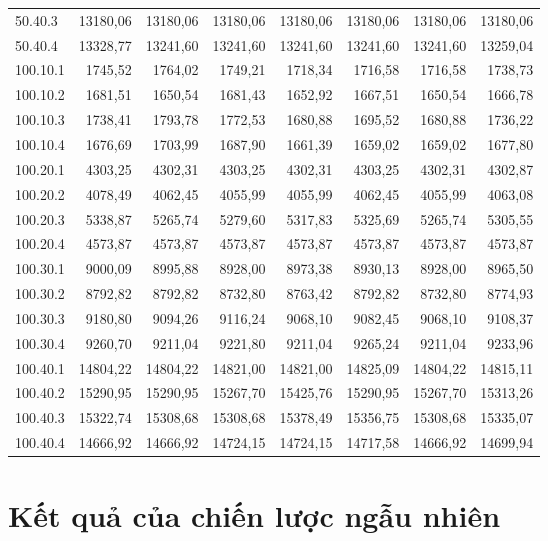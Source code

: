\documentclass[../DoAn.tex]{subfiles}
\begin{document}
\begin{small}
\begin{longtable}{l|rrrrr|rr}
50.40.3 & 13180,06 & 13180,06 & 13180,06 & 13180,06 & 13180,06 & 13180,06 & 13180,06 \\
50.40.4 & 13328,77 & 13241,60 & 13241,60 & 13241,60 & 13241,60 & 13241,60 & 13259,04 \\
100.10.1 & 1745,52 & 1764,02 & 1749,21 & 1718,34 & 1716,58 & 1716,58 & 1738,73 \\
100.10.2 & 1681,51 & 1650,54 & 1681,43 & 1652,92 & 1667,51 & 1650,54 & 1666,78 \\
100.10.3 & 1738,41 & 1793,78 & 1772,53 & 1680,88 & 1695,52 & 1680,88 & 1736,22 \\
100.10.4 & 1676,69 & 1703,99 & 1687,90 & 1661,39 & 1659,02 & 1659,02 & 1677,80 \\
100.20.1 & 4303,25 & 4302,31 & 4303,25 & 4302,31 & 4303,25 & 4302,31 & 4302,87 \\
100.20.2 & 4078,49 & 4062,45 & 4055,99 & 4055,99 & 4062,45 & 4055,99 & 4063,08 \\
100.20.3 & 5338,87 & 5265,74 & 5279,60 & 5317,83 & 5325,69 & 5265,74 & 5305,55 \\
100.20.4 & 4573,87 & 4573,87 & 4573,87 & 4573,87 & 4573,87 & 4573,87 & 4573,87 \\
100.30.1 & 9000,09 & 8995,88 & 8928,00 & 8973,38 & 8930,13 & 8928,00 & 8965,50 \\
100.30.2 & 8792,82 & 8792,82 & 8732,80 & 8763,42 & 8792,82 & 8732,80 & 8774,93 \\
100.30.3 & 9180,80 & 9094,26 & 9116,24 & 9068,10 & 9082,45 & 9068,10 & 9108,37 \\
100.30.4 & 9260,70 & 9211,04 & 9221,80 & 9211,04 & 9265,24 & 9211,04 & 9233,96 \\
100.40.1 & 14804,22 & 14804,22 & 14821,00 & 14821,00 & 14825,09 & 14804,22 & 14815,11 \\
100.40.2 & 15290,95 & 15290,95 & 15267,70 & 15425,76 & 15290,95 & 15267,70 & 15313,26 \\
100.40.3 & 15322,74 & 15308,68 & 15308,68 & 15378,49 & 15356,75 & 15308,68 & 15335,07 \\
100.40.4 & 14666,92 & 14666,92 & 14724,15 & 14724,15 & 14717,58 & 14666,92 & 14699,94 \\
\end{longtable}
\end{small}

\section{Kết quả của chiến lược ngẫu nhiên}
\end{document}

